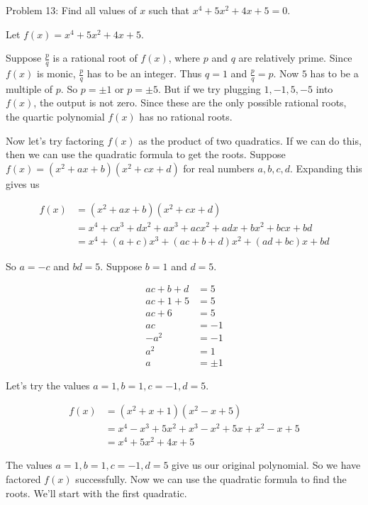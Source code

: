 Problem 13: Find all values of $x$ such that $x^4 +5x^2 + 4x + 5=0$.

Let $f(x) = x^4 + 5x^2 + 4x + 5$.

Suppose $\frac{p}{q}$ is a rational root of $f(x)$, where $p$ and $q$ are relatively prime. Since $f(x)$ is monic, $\frac{p}{q}$ has to be an integer. Thus $q = 1$ and $\frac{p}{q} = p$. Now $5$ has to be a multiple of $p$. So $p = \pm 1$ or $p = \pm 5$. But if we try plugging $1, -1, 5, -5$ into $f(x)$, the output is not zero. Since these are the only possible rational roots, the quartic polynomial $f(x)$ has no rational roots.

Now let's try factoring $f(x)$ as the product of two quadratics. If we can do this, then we can use the quadratic formula to get the roots. Suppose $f(x) = (x^2 + ax + b)(x^2 + cx + d)$ for real numbers $a, b, c, d$. Expanding this gives us

\begin{align*}
f(x) &= (x^2 + ax + b)(x^2 + cx + d) \\
&= x^4 + cx^3 + dx^2 + ax^3 + acx^2 + adx + bx^2 + bcx + bd \\
&= x^4 + (a + c)x^3 + (ac + b + d)x^2 + (ad + bc)x + bd
\end{align*}

So $a = -c$ and $bd = 5$. Suppose $b = 1$ and $d = 5$.

\begin{align*}
ac + b + d &= 5 \\
ac + 1 + 5 &= 5 \\
ac + 6 &= 5 \\
ac &= -1 \\
-a^2 &= -1 \\
a^2 &= 1 \\
a &= \pm 1
\end{align*}

Let's try the values $a = 1, b = 1, c = -1, d = 5$.

\begin{align*}
f(x) &= (x^2 + x + 1)(x^2 - x + 5) \\
&= x^4 - x^3 + 5x^2 + x^3 - x^2 + 5x + x^2 - x + 5 \\
&= x^4 + 5x^2 + 4x + 5
\end{align*}

The values $a = 1, b = 1, c = -1, d = 5$ give us our original polynomial. So we have factored $f(x)$ successfully. Now we can use the quadratic formula to find the roots. We'll start with the first quadratic.

